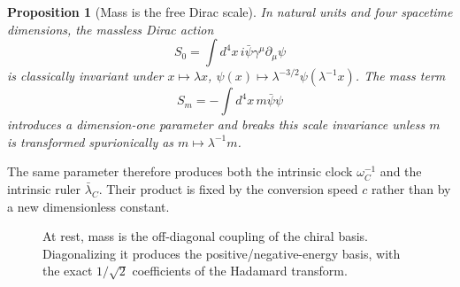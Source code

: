 \documentclass[11pt]{article}
\newtheorem{proposition}[theorem]{Proposition}
\theoremstyle{definition}\newtheorem{definition}[theorem]{Definition}
\theoremstyle{remark}\newtheorem{remark}[theorem]{Remark}\newtheorem{conjecture}[theorem]{Conjecture}
\begin{document}
\begin{proposition}[Mass is the free Dirac scale]\label{prop:scale}
In natural units and four spacetime dimensions, the massless Dirac action
\begin{equation}
 S_0=\int d^4x\,i\bar\psi\gamma^\mu\partial_\mu\psi
\end{equation}
is classically invariant under $x\mapsto\lambda x$, $\psi(x)\mapsto\lambda^{-3/2}\psi(\lambda^{-1}x)$. The mass term
\begin{equation}
 S_m=-\int d^4x\,m\bar\psi\psi
\end{equation}
introduces a dimension-one parameter and breaks this scale invariance unless $m$ is transformed spurionically as $m\mapsto\lambda^{-1}m$.
\end{proposition}
The same parameter therefore produces both the intrinsic clock $\omega_C^{-1}$ and the intrinsic ruler $\bar\lambda_C$. Their product is fixed by the conversion speed $c$ rather than by a new dimensionless constant.

\begin{figure}[t]
\centering
{}
\caption{At rest, mass is the off-diagonal coupling of the chiral basis. Diagonalizing it produces the positive/negative-energy basis, with the exact $1/\sqrt2$ coefficients of the Hadamard transform.}
\label{fig:hadamard}
\end{figure}
\end{document}
